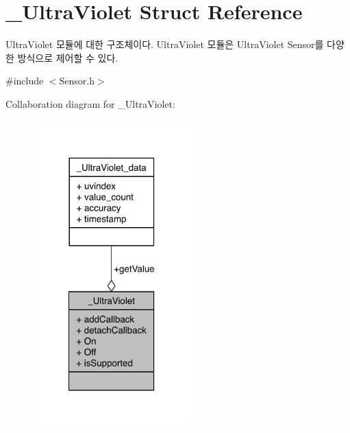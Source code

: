 \hypertarget{struct__UltraViolet}{\section{\-\_\-\-Ultra\-Violet Struct Reference}
\label{struct__UltraViolet}
}


Ultra\-Violet 모듈에 대한 구조체이다. Ultra\-Violet 모듈은 Ultra\-Violet Sensor를 다양한 방식으로 제어할 수 있다.  




{\ttfamily \#include $<$Sensor.\-h$>$}



Collaboration diagram for \-\_\-\-Ultra\-Violet\-:\nopagebreak
\begin{figure}[H]
\begin{center}
\leavevmode
\includegraphics[width=173pt]{d8/d41/struct__UltraViolet__coll__graph}
\end{center}
\end{figure}
